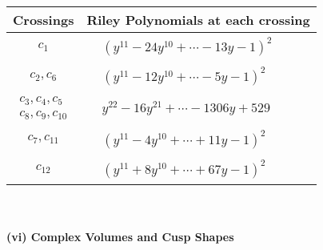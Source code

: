 \documentclass[1p]{elsarticle_modified}
\theoremstyle{definition}
\begin{document}
\begin{tabular}{m{50pt}|m{274pt}}
Crossings & \hspace{64pt}Riley Polynomials at each crossing \\
\hline $$\begin{aligned}c_{1}\end{aligned}$$&$\begin{aligned}
&(y^{11}-24 y^{10}+\cdots-13 y-1)^{2}
\end{aligned}$\\
\hline $$\begin{aligned}c_{2},c_{6}\end{aligned}$$&$\begin{aligned}
&(y^{11}-12 y^{10}+\cdots-5 y-1)^{2}
\end{aligned}$\\
\hline $$\begin{aligned}c_{3},c_{4},c_{5}\\c_{8},c_{9},c_{10}\end{aligned}$$&$\begin{aligned}
&y^{22}-16 y^{21}+\cdots-1306 y+529
\end{aligned}$\\
\hline $$\begin{aligned}c_{7},c_{11}\end{aligned}$$&$\begin{aligned}
&(y^{11}-4 y^{10}+\cdots+11 y-1)^{2}
\end{aligned}$\\
\hline $$\begin{aligned}c_{12}\end{aligned}$$&$\begin{aligned}
&(y^{11}+8 y^{10}+\cdots+67 y-1)^{2}
\end{aligned}$\\
\hline
\end{tabular}\\~\\
\newpage\flushleft \textbf{(vi) Complex Volumes and Cusp Shapes}
\end{document}
